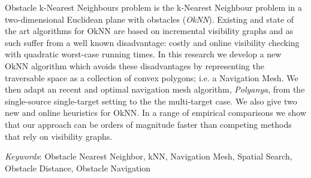 Obstacle k-Nearest Neighbours problem is the k-Nearest Neighbour problem in a 
two-dimensional Euclidean plane with obstacles (\emph{OkNN}).
Existing and state of the art algorithms for OkNN are based on incremental 
visibility graphs and as such suffer from a well known disadvantage: costly 
and online visibility checking with quadratic worst-case running times.
In this research we develop a new OkNN algorithm which avoids these disadvantages
by representing the traversable space as a collection of convex polygons; i.e.
a Navigation Mesh. 
We then adapt an recent and optimal navigation mesh algorithm, \textit{Polyanya}, from the
single-source single-target setting to the the multi-target case. 
We also give two new and online heuristics for OkNN.
In a range of empirical comparisons we show that our approach can be orders of magnitude faster than competing methods that rely on visibility graphs.

\textit{Keywords}: Obstacle Nearest Neighbor, kNN, Navigation Mesh, Spatial Search, Obstacle
Distance, Obstacle Navigation
